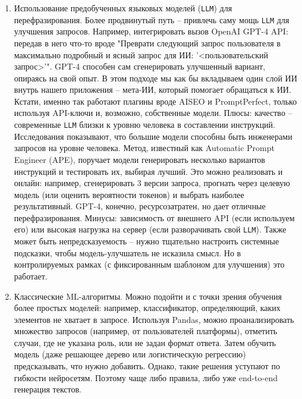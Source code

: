 \begin{enumerate}[label=\arabic*]
\item Использование предобученных языковых моделей (\texttt{LLM}) для перефразирования. Более продвинутый путь – привлечь саму мощь \texttt{LLM} для улучшения запросов. Например, интегрировать вызов OpenAI GPT-4 API: передав в него что-то вроде "Преврати следующий запрос пользователя в максимально подробный и ясный запрос для ИИ: '<пользовательский запрос>'". GPT-4 способен сам сгенерировать улучшенный вариант, опираясь на свой опыт. В этом подходе мы как бы вкладываем один слой ИИ внутрь нашего приложения – мета-ИИ, который помогает обращаться к ИИ. Кстати, именно так работают плагины вроде AISEO и PromptPerfect, только используя API-ключи и, возможно, собственные модели. Плюсы: качество – современные \texttt{LLM} близки к уровню человека в составлении инструкций\cite{restack:advprompt}. Исследования показывают, что большие модели способны быть инженерами запросов на уровне человека\cite{arxiv:2211.01910}. Метод, известный как Automatic Prompt Engineer (APE), поручает модели генерировать несколько вариантов инструкций и тестировать их, выбирая лучший\cite{restack:advprompt}. Это можно реализовать и онлайн: например, сгенерировать 3 версии запроса, прогнать через целевую модель (или оценить вероятности токенов) и выбрать наиболее результативный. GPT-4, конечно, ресурсозатратен, но дает отличные перефразирования. Минусы: зависимость от внешнего API (если используем его) или высокая нагрузка на сервер (если разворачивать свой \texttt{LLM}). Также может быть непредсказуемость – нужно тщательно настроить системные подсказки, чтобы модель-улучшатель не исказила смысл. Но в контролируемых рамках (с фиксированным шаблоном для улучшения) это работает.


\item Классические ML-алгоритмы. Можно подойти и с точки зрения обучения более простых моделей: например, классификатор, определяющий, каких элементов не хватает в запросе. Используя Pandas, можно проанализировать множество запросов (например, от пользователей платформы), отметить случаи, где не указана роль, или не задан формат ответа. Затем обучить модель (даже решающее дерево или логистическую регрессию) предсказывать, что нужно добавить. Однако, такие решения уступают по гибкости нейросетям. Поэтому чаще либо правила, либо уже end-to-end генерация текстов.


\end{enumerate}
